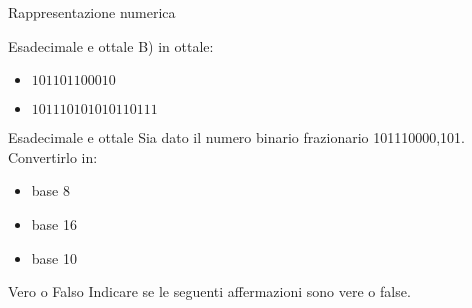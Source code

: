 \documentclass[11pt]{article}
\begin{document}
\begin{quiz}{Rappresentazione numerica}
\begin{cloze}[points=1,shuffle=false]{Esadecimale e ottale}
B) in ottale:
\begin{itemize}
\item $101101100010$ 
\item $101110101010110111$ 
\end{itemize}
\end{cloze}

\begin{cloze}[points=1,shuffle=false]{Esadecimale e ottale}
Sia dato il numero binario frazionario 101110000,101. Convertirlo in:

\begin{itemize}
\item base 8 
\item base 16 
\item base 10 
\end{itemize}
\end{cloze}

\begin{cloze}[points=1,shuffle=false]{Vero o Falso}
Indicare se le seguenti affermazioni sono vere o false.


\end{cloze}
\end{quiz}
\end{document}
